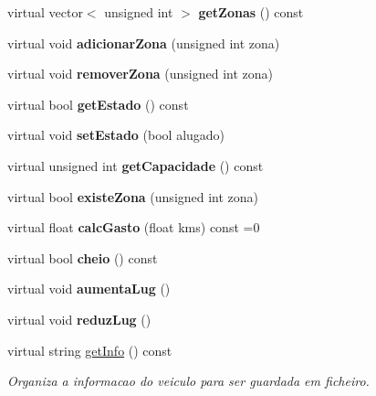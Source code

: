 \begin{DoxyCompactItemize}
\item 
\mbox{\label{class_veiculo_a0be7cbd0298ea47a60508f62c899c733}} 
virtual vector$<$ unsigned int $>$ {\bfseries get\+Zonas} () const
\item 
\mbox{\label{class_veiculo_a8b57e5682a2387a38eb4b8000cc70c18}} 
virtual void {\bfseries adicionar\+Zona} (unsigned int zona)
\item 
\mbox{\label{class_veiculo_ae916bf4719fe50b335a72aea193d3916}} 
virtual void {\bfseries remover\+Zona} (unsigned int zona)
\item 
\mbox{\label{class_veiculo_a964fd208eb010bf1a693247b4ff83acb}} 
virtual bool {\bfseries get\+Estado} () const
\item 
\mbox{\label{class_veiculo_ad8e27ab7a739537280787e8b47c6e317}} 
virtual void {\bfseries set\+Estado} (bool alugado)
\item 
\mbox{\label{class_veiculo_aa0828192f9821ff9e319cc7b26729e9e}} 
virtual unsigned int {\bfseries get\+Capacidade} () const
\item 
\mbox{\label{class_veiculo_aa3061935859118b6364559d48aa5d3ae}} 
virtual bool {\bfseries existe\+Zona} (unsigned int zona)
\item 
\mbox{\label{class_veiculo_ad256b27a0674b084cdf1e26a019ffedc}} 
virtual float {\bfseries calc\+Gasto} (float kms) const =0
\item 
\mbox{\label{class_veiculo_a185fc0670609d87e415e849ed5b6f528}} 
virtual bool {\bfseries cheio} () const
\item 
\mbox{\label{class_veiculo_a9b7aca616ed9b33fc6b0d62f63765013}} 
virtual void {\bfseries aumenta\+Lug} ()
\item 
\mbox{\label{class_veiculo_a9ffe3fdff35855b37350fbd75530b305}} 
virtual void {\bfseries reduz\+Lug} ()
\item 
virtual string \mbox{\hyperlink{class_veiculo_a37cf6866bac6b2e7e8837237ec293d48}{get\+Info}} () const
\begin{DoxyCompactList}\small\item\em Organiza a informacao do veiculo para ser guardada em ficheiro. \end{DoxyCompactList}\end{DoxyCompactItemize}
